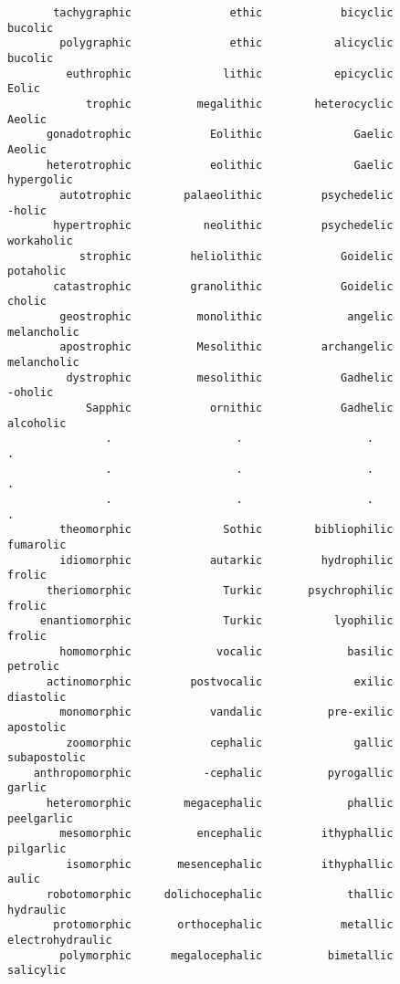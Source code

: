 \begin{verbatim}
       tachygraphic               ethic            bicyclic             bucolic 
        polygraphic               ethic           alicyclic             bucolic 
         euthrophic              lithic           epicyclic               Eolic 
            trophic          megalithic        heterocyclic              Aeolic 
      gonadotrophic            Eolithic              Gaelic              Aeolic 
      heterotrophic            eolithic              Gaelic          hypergolic 
        autotrophic        palaeolithic         psychedelic              -holic 
       hypertrophic           neolithic         psychedelic          workaholic 
           strophic         heliolithic            Goidelic           potaholic 
       catastrophic         granolithic            Goidelic              cholic 
        geostrophic          monolithic             angelic         melancholic 
        apostrophic          Mesolithic         archangelic         melancholic 
         dystrophic          mesolithic            Gadhelic             -oholic 
            Sapphic            ornithic            Gadhelic           alcoholic 
               .                   .                   .                   .
               .                   .                   .                   .
               .                   .                   .                   .
        theomorphic              Sothic        bibliophilic           fumarolic 
        idiomorphic            autarkic         hydrophilic              frolic 
      theriomorphic              Turkic       psychrophilic              frolic 
     enantiomorphic              Turkic           lyophilic              frolic 
        homomorphic             vocalic             basilic            petrolic 
      actinomorphic         postvocalic              exilic           diastolic 
        monomorphic            vandalic          pre-exilic           apostolic 
         zoomorphic            cephalic              gallic        subapostolic 
    anthropomorphic           -cephalic          pyrogallic              garlic 
      heteromorphic        megacephalic             phallic          peelgarlic 
        mesomorphic          encephalic         ithyphallic           pilgarlic 
         isomorphic       mesencephalic         ithyphallic               aulic 
      robotomorphic     dolichocephalic             thallic           hydraulic 
       protomorphic       orthocephalic            metallic    electrohydraulic 
        polymorphic      megalocephalic          bimetallic           salicylic 

\end{verbatim}
